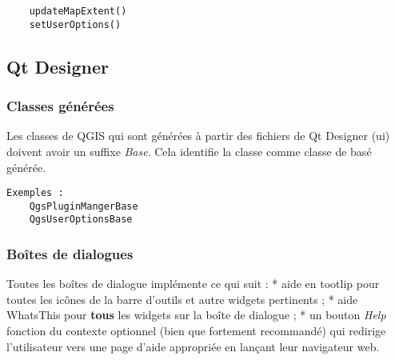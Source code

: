 \begin{verbatim}
	updateMapExtent()
	setUserOptions()
\end{verbatim}

\subsection{Qt Designer}
\subsubsection{Classes g\'en\'er\'ees}
Les classes de QGIS qui sont g\'en\'er\'ees \`a partir des fichiers de Qt Designer (ui) doivent avoir un suffixe \textit{Base}. Cela identifie la classe comme classe de bas\'e g\'en\'er\'ee.

\begin{verbatim}
Exemples :
	QgsPluginMangerBase
	QgsUserOptionsBase
\end{verbatim}
\subsubsection{Bo\^ites de dialogues}
Toutes les bo\^ites de dialogue impl\'emente ce qui suit :
 * aide en tootlip pour toutes les ic\^ones de la barre d'outils et autre widgets pertinents ;
  * aide WhatsThis pour \textbf{tous} les widgets sur la bo\^ite de dialogue ;
  * un bouton \textit{Help} fonction du contexte optionnel (bien que fortement recommand\'e) qui redirige l'utilisateur vers une page d'aide appropri\'ee en lan\c{c}ant leur navigateur web.

